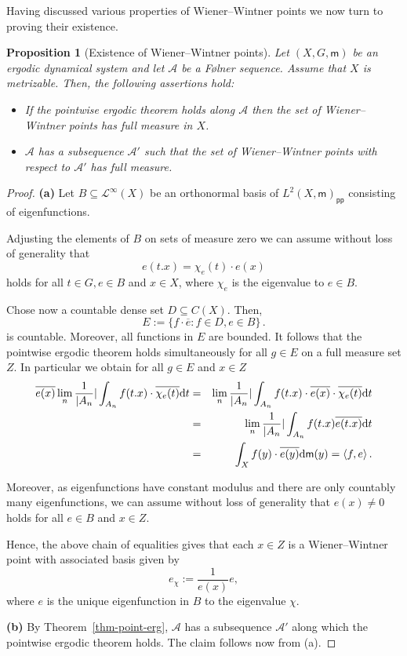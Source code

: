 \documentclass [14pt]{amsart}
\numberwithin{equation}{section}
\newcommand{\cL}{{\mathcal L}}
\newcommand{\cA}{{\mathcal A}}
\newcommand{\mm}{\mathsf{m}}
\newcommand{\dd}{\mbox{\rm d}}
\newtheorem{prop}[theorem]{Proposition}
\begin{document}
Having discussed various properties of Wiener--Wintner points we now turn to proving their existence.

\begin{prop}[Existence of Wiener--Wintner points]\label{existence-strong-gen} Let $(X, G, \mm)$ be an ergodic dynamical system and let $\cA$ be a F\o lner  sequence. Assume that $X$ is metrizable. Then, the following assertions hold:

\begin{itemize}
  \item[(a)]If  the pointwise ergodic theorem holds along $\cA$ then the set of Wiener--Wintner points has full measure in $X$.
  \item[(b)] $\cA$ has a subsequence $\cA'$ such that the set of Wiener--Wintner points  with respect to $\cA'$ has full measure.
\end{itemize}
\end{prop}
\begin{proof}
\textbf{(a)} Let $B \subseteq \cL^\infty(X)$ be an orthonormal basis of $L^2 (X,\mm)_{\textsf{pp}}$ consisting of eigenfunctions.

Adjusting the elements of $B$ on sets of measure zero we can assume without loss of generality that
$$e(t.x) = \chi_e (t) \cdot e (x)$$
holds for all $t\in G, e \in B$ and $x\in X$, where $\chi_e$ is the eigenvalue to $e\in B$.


Chose now  a  countable dense set $D \subseteq C(X)$. Then,
\[
E:= \{ f \cdot \overline{e} : f \in D, e\in B \}  \,.
\]
is countable. Moreover, all functions in $E$ are bounded. It follows that the pointwise  ergodic theorem holds simultaneously for all $g \in E$ on a full measure set $Z$. In particular we obtain for all $g\in E$ and $x\in Z$
\begin{eqnarray*}
\overline{e (x)} \lim_n \frac{1}{|A_n}| \int_{A_n} f(t.x) \cdot \overline{\chi_e (t)} \dd t
&= & \lim_n \frac{1}{|A_n}| \int_{A_n} f(t.x) \cdot \overline{e(x)} \cdot \overline{\chi_e (t)} \dd t\\
&=& \lim_n \frac{1}{|A_n}| \int_{A_n} f(t.x) \overline{e (t.x)}  \dd t\\
& = & \int_X f(y) \cdot \overline{ e(y)} \dd \mm (y) = \langle f, e\rangle \,.
\end{eqnarray*}

Moreover, as eigenfunctions have constant modulus and there are only countably many eigenfunctions, we can assume without loss of generality that $e(x)\neq 0$ holds for all $e\in B$ and $x\in Z$.

Hence, the above chain of equalities gives that
each  $x\in Z$ is a Wiener--Wintner point with associated basis given by 
$$e_\chi := \frac{1}{e(x)} e,$$
where $e$ is the unique eigenfunction in $B$ to the eigenvalue $\chi$.


\textbf{(b)} By  Theorem~\ref{thm-point-erg}, $\cA$ has a subsequence $\cA'$ along which the pointwise ergodic theorem holds. The claim follows now from (a).
\end{proof}
\end{document}
